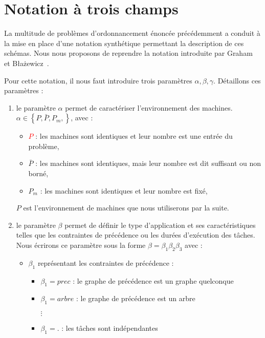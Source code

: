 \documentclass[a4paper,11pt]{report}
\begin{document}
\section{Notation à trois champs}

La multitude de problèmes d'ordonnancement énoncée précédemment a conduit à la mise en place d'une
notation synthétique permettant la description de ces schémas. Nous nous proposons de reprendre la
notation introduite par Graham~\cite{graham} et B\l a\.zewicz~\cite{blazewicz}. 

Pour cette notation, il nous faut introduire trois paramètres $\alpha, \beta, \gamma$. Détaillons
ces paramètres :
\begin{enumerate}
    \item le paramètre $\alpha$ permet de caractériser l'environnement des machines. $\alpha \in
        \left\{ P, \bar{P}, P_m, \right\}$, avec :
        \begin{itemize}
            \item \textcolor{red}{$P$} : les machines sont identiques et leur nombre est une entrée du
                problème, 
            \item $\bar{P}$ : les machines sont identiques, mais leur nombre est dit suffisant ou
                non borné,
            \item $P_m$ : les machines sont identiques et leur nombre est fixé,
        \end{itemize}
        $P$ est l'environnement de machines que nous utiliserons par la suite.
    \item le paramètre $\beta$ permet de définir le type d'application et ses caractéristiques
        telles que les contraintes de précédence ou les durées d'exécution des tâches. Nous écrirons
        ce paramètre sous la forme $\beta = \beta_1\beta_2\beta_3$ avec :
        \begin{itemize}[label=$\bullet$]
            \item $\beta_1$ représentant les contraintes de précédence :
                \begin{itemize}
                    \item $\beta_1 = prec$ : le graphe de précédence est un graphe quelconque
                    \item $\beta_1 = arbre$ : le graphe de précédence est un arbre
                    \item[$\vdots$]
                    \item $\beta_1 = .$ : les tâches sont indépendantes
                \end{itemize}

\end{itemize}
\end{enumerate}
\end{document}
